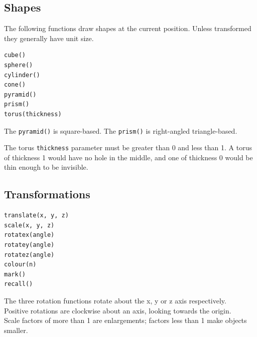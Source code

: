 \documentclass[12pt,a4paper,twoside]{article}
\renewcommand{\_}{\texttt{\symbol{95}}}
\begin{document}
%
%

\subsection{Shapes}

The following functions draw shapes at the current position.
Unless transformed they generally have unit size.

\begin{verbatim}
cube()
sphere()
cylinder()
cone()
pyramid()
prism()
torus(thickness)
\end{verbatim}

The \verb^pyramid()^ is square-based. The \verb^prism()^ is right-angled
triangle-based.

The torus \verb^thickness^ parameter
must be greater than 0 and less than 1. A torus of thickness 1 would
have no hole in the middle, and one of thickness 0 would be thin enough to be
invisible.

\subsection{Transformations}

\begin{verbatim}
translate(x, y, z)
scale(x, y, z)
rotatex(angle)
rotatey(angle)
rotatez(angle)
colour(n)
mark()
recall()
\end{verbatim}

The three rotation functions rotate about the x, y or z axis respectively.\\
Positive rotations are clockwise about an axis, looking towards the origin.\\
Scale factors of more than 1 are enlargements; factors less than 1 make
objects smaller.
\end{document}
